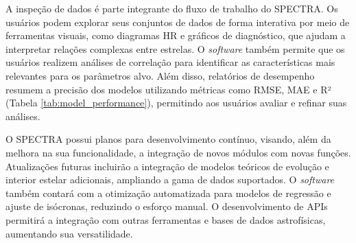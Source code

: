 \begin{apendicesenv}
A inspeção de dados é parte integrante do fluxo de trabalho do SPECTRA. Os usuários podem explorar seus conjuntos de dados de forma interativa por meio de ferramentas visuais, como diagramas HR e gráficos de diagnóstico, que ajudam a interpretar relações complexas entre estrelas. O \textit{software} também permite que os usuários realizem análises de correlação para identificar as características mais relevantes para os parâmetros alvo. Além disso, relatórios de desempenho resumem a precisão dos modelos utilizando métricas como RMSE, MAE e R² (Tabela \ref{tab:model_performance}), permitindo aos usuários avaliar e refinar suas análises.



O SPECTRA possui planos para desenvolvimento contínuo, visando, além da melhora na sua funcionalidade, a integração de novos módulos com novas funções. Atualizações futuras incluirão a integração de modelos teóricos de evolução e interior estelar adicionais, ampliando a gama de dados suportados. O \textit{software} também contará com a otimização automatizada para modelos de regressão e ajuste de isócronas, reduzindo o esforço manual. O desenvolvimento de APIs permitirá a integração com outras ferramentas e bases de dados astrofísicas, aumentando sua versatilidade.

\end{apendicesenv}